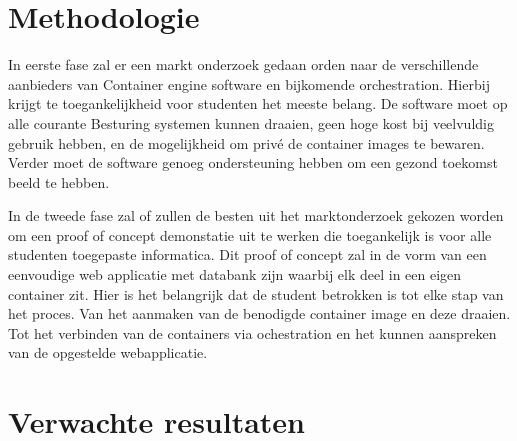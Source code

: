 





\section{Methodologie}
\label{sec:methodologie}

In eerste fase zal er een markt onderzoek gedaan orden naar de verschillende aanbieders van Container engine software en bijkomende  orchestration. Hierbij krijgt te toegankelijkheid voor studenten het meeste belang. De software moet op alle courante Besturing systemen kunnen draaien, geen hoge kost bij veelvuldig gebruik hebben, en de mogelijkheid om privé de container images te bewaren. Verder moet de software genoeg ondersteuning hebben om een gezond toekomst beeld te hebben.

In de tweede fase zal of zullen de besten uit het marktonderzoek gekozen worden om een proof of concept demonstatie uit te werken die toegankelijk is voor alle studenten toegepaste informatica. Dit proof of concept zal in de vorm van een eenvoudige web applicatie met databank zijn waarbij elk deel in een eigen container zit. Hier is het belangrijk dat de student betrokken is tot elke stap van het proces. Van het aanmaken van de benodigde container image en deze draaien. Tot het verbinden van de containers via ochestration en het kunnen aanspreken van de opgestelde webapplicatie.   


\section{Verwachte resultaten}
\label{sec:verwachte_resultaten}

